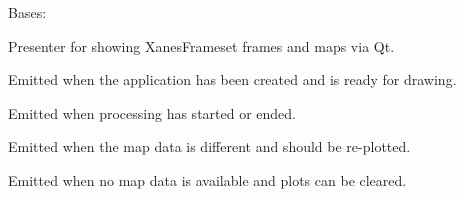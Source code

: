 \documentclass[letterpaper,10pt,english]{sphinxmanual}
\begin{document}
\begin{fulllineitems}
\label{\detokenize{xanespy:xanespy.qt_frameset_presenter.QtFramesetPresenter}}
Bases: 

Presenter for showing XanesFrameset frames and maps via Qt.

\begin{fulllineitems}
\label{\detokenize{xanespy:xanespy.qt_frameset_presenter.QtFramesetPresenter.app_ready}}
 \textendash{} Emitted when the application has been created and is ready for drawing.

\end{fulllineitems}


\begin{fulllineitems}
\label{\detokenize{xanespy:xanespy.qt_frameset_presenter.QtFramesetPresenter.busy_status_changed}}
 \textendash{} Emitted when processing has started or ended.

\end{fulllineitems}


\begin{fulllineitems}
\label{\detokenize{xanespy:xanespy.qt_frameset_presenter.QtFramesetPresenter.map_data_changed}}
 \textendash{} Emitted when the map data is different and should be re-plotted.

\end{fulllineitems}


\begin{fulllineitems}
\label{\detokenize{xanespy:xanespy.qt_frameset_presenter.QtFramesetPresenter.map_data_cleared}}
 \textendash{} Emitted when no map data is available and plots can be cleared.


\end{fulllineitems}
\end{fulllineitems}
\end{document}
